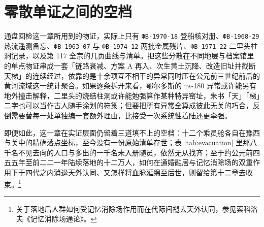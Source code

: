 \section{零散单证之间的空档}

通盘回检这一章所用到的物证，实际上只有 \texttt{ФВ-1970-18} 登船核对册、\texttt{ФВ-1968-29} 热流遥测备忘、\texttt{ФВ-1963-07} 与 \texttt{ФВ-1974-12} 两批金属残片、\texttt{ФВ-1971-22} 二里头柱洞记录，以及第 117 全宗的几页曲线与清单。把这些分散在不同地层与档案馆里的单点物证串成一套「链路衰减、方案 A 再入、次生黄土沉降、改造旧址并截断天梯」的连续经过，依靠的是十余项互不相干的异常同时压在公元前三世纪前后的黄河流域这一统计聚合。如果逐条拆开来看，鄂尔多斯的 \textsc{ta}-180 异常或许能另有地外撞击解释，二里头的烧结柱洞或许能勉强算作某种特异窑址，朱书「天」「梯」二字也可以当作古人随手涂划的符箓；但要把所有异常全算成彼此无关的巧合，反倒需要替每一处单独编一套额外理由，比接受一次系统性着陆还更牵强。

即便如此，这一章在实证层面仍留着三道填不上的空档：十二个乘员舱各自在豫西与关中的精确落点坐标，至今没有一份原始清单存世；表 \ref{tab:evacuation} 里那八千名不见去向的人口与多出的一千名未入册随员，依然无从找齐；至于约公元前四五五年至前二二一年陆续落地的十二万人，如何在通婚融居与记忆消除场的双重作用下于四代之内消退天外认同、又怎样将血脉延绵至后世，则留给第十二章去收束。\footnote{关于落地后人群如何受记忆消除场作用而在代际间褪去天外认同，参见索科洛夫《记忆消除场通论》。}
